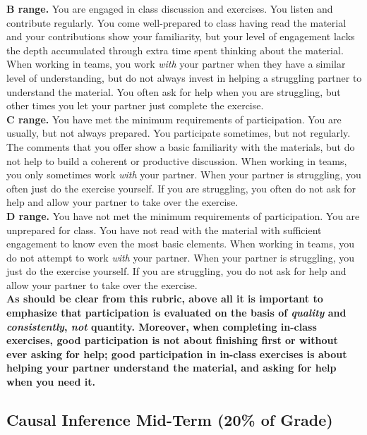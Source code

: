 \documentclass[12pt]{article}
\begin{document}
\textbf{B range.}  You are engaged in class discussion and exercises.  You listen and contribute regularly.  You come well-prepared to class having read the material and your contributions show your familiarity, but your level of engagement lacks the depth accumulated through extra time spent thinking about the material.  When working in teams, you work \emph{with} your partner when they have a similar level of understanding, but do not always invest in helping a struggling partner to understand the material. You often ask for help when you are struggling, but other times you let your partner just complete the exercise. \\

\textbf{C range.}  You have met the minimum requirements of participation.  You are usually, but not always prepared.  You participate sometimes, but not regularly.  The comments that you offer show a basic familiarity with the materials, but do not help to build a coherent or productive discussion.  When working in teams, you only sometimes work \emph{with} your partner. When your partner is struggling, you often just do the exercise yourself. If you are struggling, you often do not ask for help and allow your partner to take over the exercise. \\

\textbf{D range.}  You have not met the minimum requirements of participation.  You are unprepared for class.  You have not read with the material with sufficient engagement to know even the most basic elements.  When working in teams, you do not attempt to work \emph{with} your partner. When your partner is struggling, you just do the exercise yourself. If you are struggling, you do not ask for help and allow your partner to take over the exercise.\\

\textbf{As should be clear from this rubric, above all it is important to emphasize that participation is evaluated on the basis of \emph{quality} and \emph{consistently}, \emph{not} quantity. Moreover, when completing in-class exercises, good participation is not about finishing first or without ever asking for help; good participation in in-class exercises is about helping your partner understand the material, and asking for help when you need it.}

\subsection{Causal Inference Mid-Term (20\% of Grade)}
\end{document}
